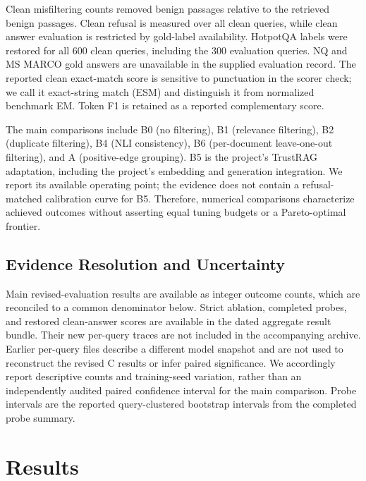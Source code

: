 \documentclass[sigconf]{aamas}
\begin{document}
Clean misfiltering counts removed benign passages relative to the retrieved benign passages. Clean refusal is measured over all clean queries, while clean answer evaluation is restricted by gold-label availability. HotpotQA labels were restored for all 600 clean queries, including the 300 evaluation queries. NQ and MS MARCO gold answers are unavailable in the supplied evaluation record. The reported clean exact-match score is sensitive to punctuation in the scorer check; we call it exact-string match (ESM) and distinguish it from normalized benchmark EM. Token F1 is retained as a reported complementary score.

The main comparisons include B0 (no filtering), B1 (relevance filtering), B2 (duplicate filtering), B4 (NLI consistency), B6 (per-document leave-one-out filtering), and A (positive-edge grouping). B5 is the project's TrustRAG adaptation, including the project's embedding and generation integration. We report its available operating point; the evidence does not contain a refusal-matched calibration curve for B5. Therefore, numerical comparisons characterize achieved outcomes without asserting equal tuning budgets or a Pareto-optimal frontier.

\subsection{Evidence Resolution and Uncertainty}
Main revised-evaluation results are available as integer outcome counts, which are reconciled to a common denominator below. Strict ablation, completed probes, and restored clean-answer scores are available in the dated aggregate result bundle. Their new per-query traces are not included in the accompanying archive. Earlier per-query files describe a different model snapshot and are not used to reconstruct the revised C results or infer paired significance. We accordingly report descriptive counts and training-seed variation, rather than an independently audited paired confidence interval for the main comparison. Probe intervals are the reported query-clustered bootstrap intervals from the completed probe summary.

\section{Results}
\end{document}
